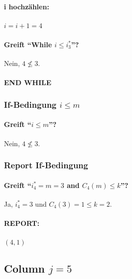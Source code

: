 \paragraph{i hochzählen:} $i = i + 1 = 4$

\paragraph{Greift ``While $i \le i_{3}^\ast$''?} Nein, $4 \not\le 3$.

\paragraph{END WHILE}

\subsubsection*{If-Bedingung $i\le m$}

\paragraph{Greift ``$i\le m$''?} Nein, $4 \not\leq 3$.

\subsubsection*{Report If-Bedingung}

\paragraph{Greift ``$i^*_4 = m = 3$ and $C_4(m) \leq k$''?} Ja, $i^*_4 = 3$ und $C_4(3) = 1 \leq k = 2$.

\paragraph{REPORT:} $(4, 1)$

\newpage



\subsection*{Column $j = 5$}


